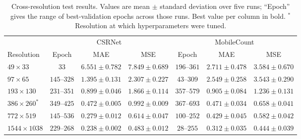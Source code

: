 \documentclass[conference]{IEEEtran}
\begin{document}
\begin{table}[t]
    \centering
    \caption{Cross-resolution test results. Values are mean $\pm$ standard
    deviation over five runs; ``Epoch'' gives the range of best-validation
    epochs across those runs. Best value per column in bold.
    $^{*}$Resolution at which hyperparameters were tuned.}
    \label{tab:resolution_test}
    \small
    \begin{tabular}{l c c c c c c}
        \toprule
        & \multicolumn{3}{c}{CSRNet} & \multicolumn{3}{c}{MobileCount} \\
        \cmidrule(lr){2-4} \cmidrule(lr){5-7}
        Resolution & Epoch & MAE & MSE & Epoch & MAE & MSE \\
        \midrule
        $49\times33$      & $33$         & $6.551 \pm 0.782$          & $7.849 \pm 0.689$          & $196$--$361$ & $2.711 \pm 0.478$          & $3.584 \pm 0.670$ \\
        $97\times65$      & $145$--$328$ & $1.395 \pm 0.131$          & $2.307 \pm 0.227$          & $43$--$309$  & $2.549 \pm 0.258$          & $3.543 \pm 0.290$ \\
        $193\times130$    & $231$--$351$ & $0.899 \pm 0.046$          & $1.866 \pm 0.114$          & $357$--$579$ & $0.905 \pm 0.084$          & $1.236 \pm 0.131$ \\
        $386\times260^{*}$& $349$--$425$ & $0.472 \pm 0.005$          & $0.992 \pm 0.009$          & $367$--$693$ & $0.471 \pm 0.034$          & $0.658 \pm 0.041$ \\
        $772\times519$    & $145$--$536$ & $0.279 \pm 0.012$          & $0.614 \pm 0.047$          & $100$--$252$ & $0.429 \pm 0.045$          & $0.582 \pm 0.042$ \\
        $1544\times1038$  & $229$--$268$ & $\mathbf{0.238 \pm 0.002}$ & $\mathbf{0.483 \pm 0.012}$ & $28$--$255$  & $\mathbf{0.312 \pm 0.035}$ & $\mathbf{0.444 \pm 0.039}$ \\
        \bottomrule
    \end{tabular}
\end{table}
\end{document}
